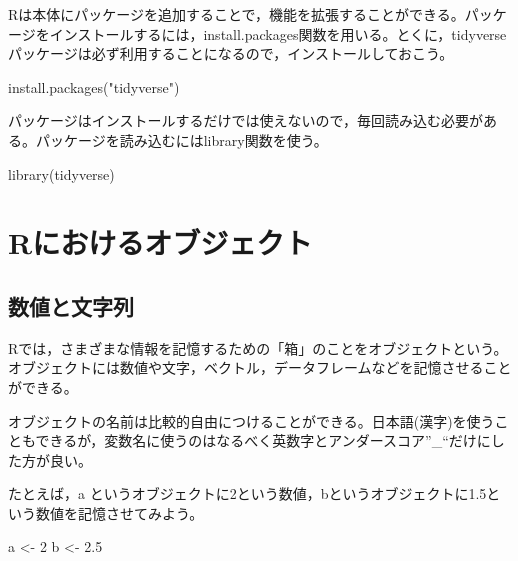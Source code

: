 \documentclass[
]{book}
\newenvironment{Shaded}{\begin{snugshade}}{\end{snugshade}}
\newcommand{\DecValTok}[1]{\textcolor[rgb]{0.00,0.00,0.81}{#1}}
\newcommand{\FloatTok}[1]{\textcolor[rgb]{0.00,0.00,0.81}{#1}}
\newcommand{\FunctionTok}[1]{\textcolor[rgb]{0.00,0.00,0.00}{#1}}
\newcommand{\NormalTok}[1]{#1}
\newcommand{\OtherTok}[1]{\textcolor[rgb]{0.56,0.35,0.01}{#1}}
\newcommand{\StringTok}[1]{\textcolor[rgb]{0.31,0.60,0.02}{#1}}
\begin{document}
Rは本体にパッケージを追加することで，機能を拡張することができる。パッケージをインストールするには，install.packages関数を用いる。とくに，tidyverseパッケージは必ず利用することになるので，インストールしておこう。

\begin{Shaded}
\begin{Highlighting}[]
\FunctionTok{install.packages}\NormalTok{(}\StringTok{"tidyverse"}\NormalTok{)}
\end{Highlighting}
\end{Shaded}

パッケージはインストールするだけでは使えないので，毎回読み込む必要がある。パッケージを読み込むにはlibrary関数を使う。

\begin{Shaded}
\begin{Highlighting}[]
\FunctionTok{library}\NormalTok{(tidyverse)}
\end{Highlighting}
\end{Shaded}

\hypertarget{rux306bux304aux3051ux308bux30aaux30d6ux30b8ux30a7ux30afux30c8}{%
\chapter{Rにおけるオブジェクト}\label{rux306bux304aux3051ux308bux30aaux30d6ux30b8ux30a7ux30afux30c8}}

\hypertarget{ux6570ux5024ux3068ux6587ux5b57ux5217}{%
\section{数値と文字列}\label{ux6570ux5024ux3068ux6587ux5b57ux5217}}

Rでは，さまざまな情報を記憶するための「箱」のことをオブジェクトという。オブジェクトには数値や文字，ベクトル，データフレームなどを記憶させることができる。

オブジェクトの名前は比較的自由につけることができる。日本語(漢字)を使うこともできるが，変数名に使うのはなるべく英数字とアンダースコア''\_``だけにした方が良い。

たとえば，a というオブジェクトに2という数値，bというオブジェクトに1.5という数値を記憶させてみよう。

\begin{Shaded}
\begin{Highlighting}[]
\NormalTok{a }\OtherTok{\textless{}{-}} \DecValTok{2}
\NormalTok{b }\OtherTok{\textless{}{-}} \FloatTok{2.5}
\end{Highlighting}
\end{Shaded}
\end{document}
